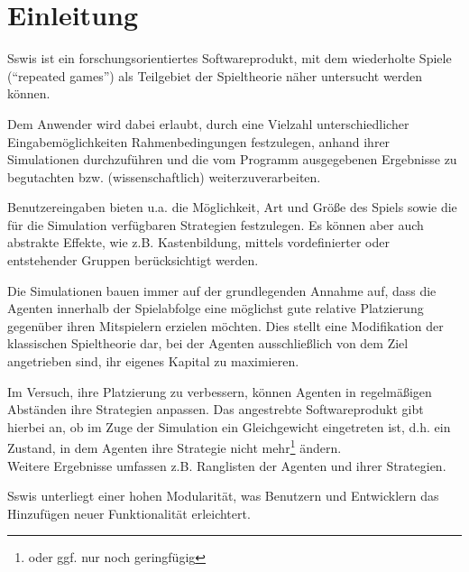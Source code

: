 \section{Einleitung}

Sswis ist ein forschungsorientiertes Softwareprodukt, mit dem wiederholte Spiele ("`repeated games"') als Teilgebiet der Spieltheorie näher untersucht werden können.

Dem Anwender wird dabei erlaubt, durch eine Vielzahl unterschiedlicher Eingabemöglichkeiten Rahmenbedingungen festzulegen, anhand ihrer Simulationen durchzuführen und die vom Programm ausgegebenen Ergebnisse zu begutachten bzw. (wissenschaftlich) weiterzuverarbeiten.

Benutzereingaben bieten u.a. die Möglichkeit, Art und Größe des Spiels sowie die für die Simulation verfügbaren Strategien festzulegen. Es können aber auch abstrakte Effekte, wie z.B. Kastenbildung, mittels vordefinierter oder entstehender Gruppen berücksichtigt werden.

Die Simulationen bauen immer auf der grundlegenden Annahme auf, dass die Agenten innerhalb der Spielabfolge eine möglichst gute relative Platzierung gegenüber ihren Mitspielern erzielen möchten.
Dies stellt eine Modifikation der klassischen Spieltheorie dar, bei der Agenten ausschließlich von dem Ziel angetrieben sind, ihr eigenes Kapital zu maximieren.

Im Versuch, ihre Platzierung zu verbessern, können Agenten in regelmäßigen Abständen ihre Strategien anpassen.
Das angestrebte Softwareprodukt gibt hierbei an, ob im Zuge der Simulation ein Gleichgewicht eingetreten ist, d.h. ein Zustand, in dem Agenten ihre Strategie nicht mehr\footnote{oder ggf. nur noch geringfügig} ändern.\\
Weitere Ergebnisse umfassen z.B. Ranglisten der Agenten und ihrer Strategien.

Sswis unterliegt einer hohen Modularität, was Benutzern und Entwicklern das Hinzufügen neuer Funktionalität erleichtert.
